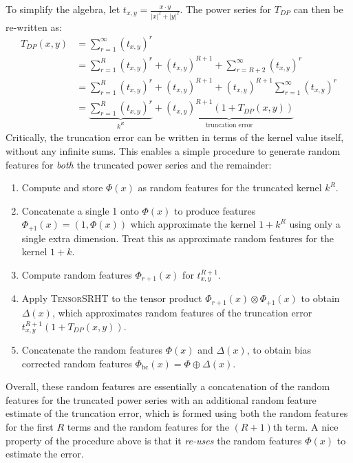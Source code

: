 \documentclass{article}
\theoremstyle{plain}
\theoremstyle{definition}
\theoremstyle{remark}
\begin{document}
To simplify the algebra,
let $t_{x,y}=\frac{x\cdot y}{|x|^2 + |y|^2}$.
The power series for $T_{DP}$ can then be re-written as:
\begin{align}
    T_{DP}(x,y) &= \sum_{r=1}^\infty \left(t_{x,y}\right)^r \nonumber\\
    &= \sum_{r=1}^{R} \left(t_{x,y}\right)^r + \left(t_{x,y}\right)^{R+1} + \sum_{r=R+2}^{\infty} \left(t_{x,y}\right)^r \nonumber\\
    &= \sum_{r=1}^{R} \left(t_{x,y}\right)^r + \left(t_{x,y}\right)^{R+1} + \left(t_{x,y}\right)^{R+1}\sum_{r=1}^{\infty} \left(t_{x,y}\right)^r \nonumber\\
    &= \underbrace{\sum_{r=1}^{R} \left(t_{x,y}\right)^r}_{k^{R}} + \underbrace{\left(t_{x,y}\right)^{R+1} \left(1 + T_{DP}(x,y)\right)}_{\text{truncation error}}
\end{align}
Critically, the truncation error can be written in terms of the kernel value itself, without any infinite sums.
This enables a simple procedure to generate random features for \emph{both} the truncated
power series and the remainder:
\begin{enumerate}
    \item Compute and store $\Phi(x)$ 
        as random features for the truncated kernel $k^{R}$.
    \item  Concatenate a single 1 onto $\Phi(x)$
        to produce features $\Phi_{+1}(x) = (1,\Phi(x))$ which approximate the kernel $1+k^{R}$
        using only a single extra dimension.
        Treat this as approximate random features for the kernel $1+k$.
    \item Compute random features $\Phi_{r+1}(x)$ for $t_{x,y}^{R+1}$.
    \item Apply \textsc{TensorSRHT} to the tensor product $\Phi_{r+1}(x)\otimes \Phi_{+1}(x)$ to obtain $\Delta(x)$,
        which approximates random features of the truncation error 
        $t_{x,y}^{R+1}(1+T_{DP}(x,y))$.
    \item Concatenate the random features $\Phi(x)$ and $\Delta(x)$, to obtain bias corrected random features $\Phi_\text{bc}(x)=\Phi\oplus \Delta(x)$.
\end{enumerate}

Overall, these random features are essentially a concatenation of
the random features for the truncated power series
with an additional random feature estimate of the truncation error,
which is formed using both the random features for the first $R$ terms
and the random features for the $(R+1)$th term.
A nice property of the procedure above is that it \emph{re-uses}
the random features $\Phi(x)$ to estimate the error.
\end{document}
